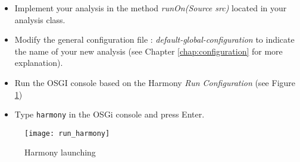 	\begin{itemize}
		\item Implement your analysis in the method \emph{runOn(Source src)} located in your analysis class.
		\item Modify the general configuration file : \emph{default-global-configuration} to indicate the name of your new analysis (see Chapter \ref{chap:configuration} for more explanation).
		\item Run the OSGI console based on the Harmony \emph{Run Configuration} (see Figure \ref{fig:run_harmony})
		\item Type \texttt{harmony} in the OSGi console and press Enter.
	\end{itemize}

	\begin{figure}[H]
		\centering
		\texttt{[image: run\_harmony]}
		\caption{Harmony launching}
		\label{fig:run_harmony}
	\end{figure}

	
	




%
%
%	
%	
%	
	
%
%
%




